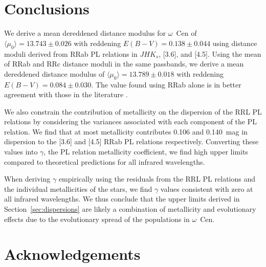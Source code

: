 \documentclass[a4paper,fleqn,usenatbib]{mnras}
\newcommand{\ocen}{$\omega$~Cen\xspace}
\begin{document}

\section{Conclusions}
\label{sec:conclusions}

We derive a mean dereddened distance modulus for \ocen of ${\langle \mu_0 \rangle = 13.743 \pm 0.026}$ with reddening ${E(B-V) = 0.138 \pm 0.044}$ using distance moduli derived from RRab PL relations in $JHK_s$, [3.6], and [4.5]. Using the mean of RRab and RRc distance moduli in the same passbands, we derive a mean dereddened distance modulus of ${\langle \mu_0 \rangle = 13.789 \pm 0.018}$ with reddening ${E(B-V) = 0.084 \pm 0.030}$. The value found using RRab alone is in better agreement with those in the literature \citep[e.g.][]{2002ASPC..265...95L, 2006ApJ...652..362D}.

We also constrain the contribution of metallicity on the dispersion of the RRL PL relations by considering the variances associated with each component of the PL relation. We find that at most metallicity contributes 0.106 and 0.140~mag in dispersion to the [3.6] and [4.5] RRab PL relations respectively. Converting these values into $\gamma$, the PL relation metallicity coefficient, we find high upper limits compared to theoretical predictions for all infrared wavelengths. 

When deriving $\gamma$ empirically using the residuals from the RRL PL relations and the individual metallicities of the stars, we find $\gamma$ values consistent with zero at all infrared wavelengths. We thus conclude that the upper limits derived in Section~\ref{sec:dispersions} are likely a combination of metallicity and evolutionary effects due to the evolutionary spread of the populations in \ocen.  


\section*{Acknowledgements}
\label{sec:acknowledgements}
\end{document}
